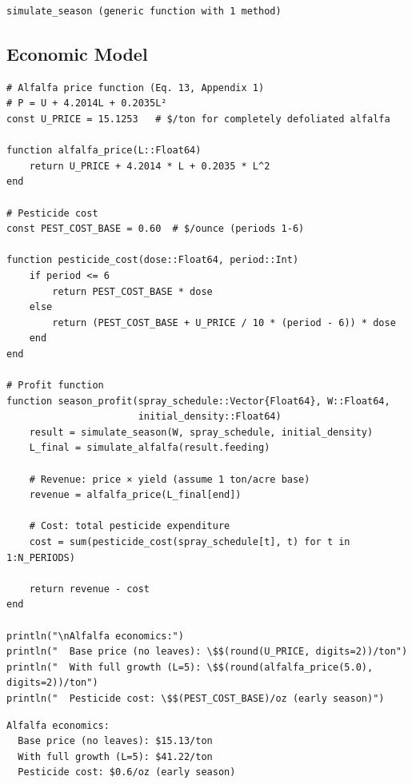 \begin{verbatim}
simulate_season (generic function with 1 method)
\end{verbatim}



\subsection{Economic Model}



\label{673101577841351619}{}



\begin{verbatim}
# Alfalfa price function (Eq. 13, Appendix 1)
# P = U + 4.2014L + 0.2035L²
const U_PRICE = 15.1253   # $/ton for completely defoliated alfalfa

function alfalfa_price(L::Float64)
    return U_PRICE + 4.2014 * L + 0.2035 * L^2
end

# Pesticide cost
const PEST_COST_BASE = 0.60  # $/ounce (periods 1-6)

function pesticide_cost(dose::Float64, period::Int)
    if period <= 6
        return PEST_COST_BASE * dose
    else
        return (PEST_COST_BASE + U_PRICE / 10 * (period - 6)) * dose
    end
end

# Profit function
function season_profit(spray_schedule::Vector{Float64}, W::Float64,
                       initial_density::Float64)
    result = simulate_season(W, spray_schedule, initial_density)
    L_final = simulate_alfalfa(result.feeding)

    # Revenue: price × yield (assume 1 ton/acre base)
    revenue = alfalfa_price(L_final[end])

    # Cost: total pesticide expenditure
    cost = sum(pesticide_cost(spray_schedule[t], t) for t in 1:N_PERIODS)

    return revenue - cost
end

println("\nAlfalfa economics:")
println("  Base price (no leaves): \$$(round(U_PRICE, digits=2))/ton")
println("  With full growth (L=5): \$$(round(alfalfa_price(5.0), digits=2))/ton")
println("  Pesticide cost: \$$(PEST_COST_BASE)/oz (early season)")
\end{verbatim}




\begin{verbatim}
Alfalfa economics:
  Base price (no leaves): $15.13/ton
  With full growth (L=5): $41.22/ton
  Pesticide cost: $0.6/oz (early season)
\end{verbatim}



